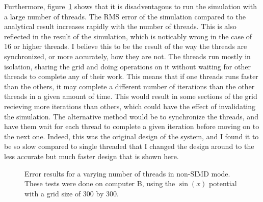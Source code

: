 Furthermore, figure~\ref{fig:err-numthreads} shows that it is disadventagous to run the simulation with
a large number of threads. The RMS error of the simulation compared to the analytical result increases
rapidly with the number of threads. This is also reflected in the result of the simulation, which is
noticably wrong in the case of 16 or higher threads. I believe this to be the result of the way the threads
are synchronized, or more accurately, how they are not. The threads run mostly in isolation, sharing the
grid and doing operations on it without waiting for other threads to complete any of their work. This means
that if one threads runs faster than the others, it may complete a different number of iterations than the other
threads in a given amount of time. This would result in some sections of the grid recieving more iterations
than others, which could have the effect of invalidating the simulation. The alternative method would be
to synchronize the threads, and have them wait for each thread to complete a given iteration before moving on
to the next one. Indeed, this was the original design of the system, and I found it to be so slow compared to
single threaded that I changed the design around to the less accurate but much faster design that is shown here.



\begin{figure}[h]
	\centering
\caption{Error results for a varying number of threads in non-SIMD mode. These
tests were done on computer B, using the $\sin(x)$ potential with a grid size of 300 by 300.}
\label{fig:err-numthreads}
\end{figure}




